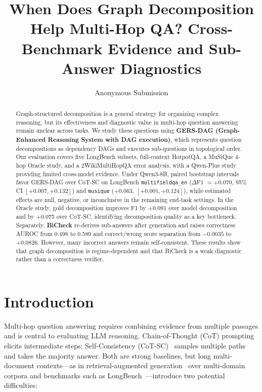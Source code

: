 \documentclass[letterpaper]{article} %
\title{When Does Graph Decomposition Help Multi-Hop QA? Cross-Benchmark Evidence and Sub-Answer Diagnostics}
\author{
    Anonymous Submission
}
\begin{document}
\maketitle

\begin{abstract}
Graph-structured decomposition is a general strategy for organizing complex reasoning, but its effectiveness and diagnostic value in multi-hop question answering remain unclear across tasks. We study these questions using \textbf{GERS-DAG (Graph-Enhanced Reasoning System with DAG execution)}, which represents question decompositions as dependency DAGs and executes sub-questions in topological order. Our evaluation covers five LongBench subsets, full-context HotpotQA, a MuSiQue 4-hop Oracle study, and a 2WikiMultiHopQA error analysis, with a Qwen-Plus study providing limited cross-model evidence. Under Qwen3-8B, paired bootstrap intervals favor GERS-DAG over CoT-SC on LongBench \texttt{multifieldqa\_en} ($\Delta$F1 $=+0.070$, 95\% CI $[+0.007,+0.132]$) and \texttt{musique} ($+0.063$, $[+0.001,+0.124]$), while estimated effects are null, negative, or inconclusive in the remaining end-task settings. In the Oracle study, gold decomposition improves F1 by +0.091 over model decomposition and by +0.075 over CoT-SC, identifying decomposition quality as a key bottleneck. Separately, \textbf{BiCheck} re-derives sub-answers after generation and raises correctness AUROC from 0.498 to 0.589 and correct/wrong score separation from $-0.0035$ to $+0.0826$. However, many incorrect answers remain self-consistent. These results show that graph decomposition is regime-dependent and that BiCheck is a weak diagnostic rather than a correctness verifier.
\end{abstract}

\section{Introduction}

Multi-hop question answering requires combining evidence from multiple passages and is central to evaluating LLM reasoning. Chain-of-Thought (CoT) prompting~\citep{wei2022cot} elicits intermediate steps; Self-Consistency (CoT-SC)~\citep{wang2023sc} samples multiple paths and takes the majority answer. Both are strong baselines, but long multi-document contexts---as in retrieval-augmented generation~\citep{lewis2020rag} over multi-domain corpora and benchmarks such as LongBench~\citep{bai2024longbench}---introduce two potential difficulties:
\end{document}
